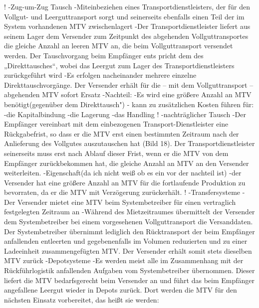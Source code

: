!                    -Zug-um-Zug Tausch
                        -Miteinbeziehen eines Transportdienstleisters, der für den Vollgut- und Leerguttransport sorgt und seinerseits ebenfalls einen Teil der im System vorhandenen MTV zwischenlagert
                        -Der Transportdienstleister liefert aus seinem Lager dem Versender zum Zeitpunkt des abgehenden Vollguttransportes die gleiche Anzahl an leeren MTV an, die beim Vollguttransport versendet werden. Der Tauschvorgang beim Empfänger ents pricht dem des „Direkttausches“, wobei das Leergut zum Lager des Transportdienstleisters zurückgeführt wird
                        -Es erfolgen nacheinander mehrere einzelne Direkttauschvorgänge. Der Versender erhält für die – mit dem Vollguttransport – abgehenden MTV sofort Ersatz
                        -Nachteil:
                            -Es wird eine größere Anzahl an MTV benötigt(gegenüber dem Direkttausch")
                                - kann zu zusätzlichen Kosten führen für: 
                                    -die Kapitalbindung 
                                    -die Lagerung 
                                    -das Handling
!                    -nachträglicher Tausch
                        -Der Empfänger vereinbart mit dem einbezogenen Transport-Dienstleister eine Rückgabefrist, so dass er die MTV erst einen bestimmten Zeitraum nach der Anlieferung des Vollgutes auszutauschen hat (Bild 18). Der Transportdienstleister seinerseits muss erst nach Ablauf dieser Frist, wenn er die MTV von dem Empfänger zurückbekommen hat, die gleiche Anzahl an MTV an den Versender weiterleiten.
                        -Eigenschaft(da ich nicht weiß ob es ein vor der nachteil ist)
                            -der Versender hat eine größere Anzahl an MTV für die fortlaufende Produktion zu bevorraten, da er die MTV mit Verzögerung zurückerhält. 
!                -Transfersysteme
                    -Der Versender mietet eine MTV beim Systembetreiber für einen vertraglich festgelegten Zeitraum an
                    -Während des Mietzeitraumes übermittelt der Versender dem Systembetreiber bei einem vorgesehenen Vollguttransport die Versanddaten. Der Systembetreiber übernimmt lediglich den Rücktransport der beim Empfänger anfallenden entleerten und gegebenenfalls im Volumen reduzierten und zu einer Ladeeinheit zusammengefügten MTV. Der Versender erhält somit stets dieselben MTV zurück
                -Depotsysteme
                        -Es werden meist alle im Zusammenhang mit der Rückführlogistik anfallenden Aufgaben vom Systembetreiber übernommen. Dieser liefert die MTV bedarfsgerecht beim Versender an und führt das beim Empfänger angefallene Leergut wieder in Depots zurück. Dort werden die MTV für den nächsten Einsatz vorbereitet, das heißt sie werden:
